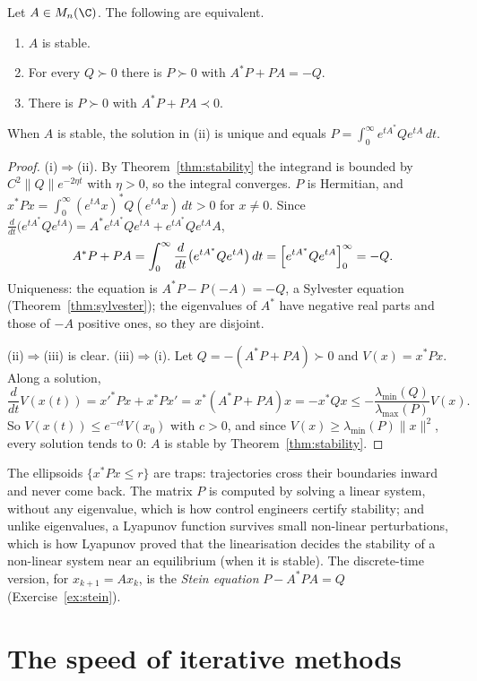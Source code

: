 \begin{theorem}[Lyapunov, 1892]\label{thm:lyapunov}
Let $A\in M_n(\C)$. The following are equivalent.
\begin{enumerate}[label=(\roman*)]
\item $A$ is stable.
\item For every $Q\succ0$ there is $P\succ0$ with $A^*P+PA=-Q$.
\item There is $P\succ0$ with $A^*P+PA\prec0$.
\end{enumerate}
When $A$ is stable, the solution in (ii) is unique and equals $P=\int_0^\infty e^{tA^*}Qe^{tA}\,dt$.
\end{theorem}
\begin{proof}
(i)$\Rightarrow$(ii). By Theorem~\ref{thm:stability} the integrand is bounded by $C^2\|Q\|e^{-2\eta t}$ with $\eta>0$, so the integral
converges. $P$ is Hermitian, and $x^*Px=\int_0^\infty(e^{tA}x)^*Q(e^{tA}x)\,dt>0$ for $x\ne0$. Since $\frac d{dt}\bigl(e^{tA^*}Qe^{tA}\bigr)=
A^*e^{tA^*}Qe^{tA}+e^{tA^*}Qe^{tA}A$,
\[
A^*P+PA=\int_0^\infty\frac d{dt}\bigl(e^{tA^*}Qe^{tA}\bigr)\,dt=\Bigl[e^{tA^*}Qe^{tA}\Bigr]_0^\infty=-Q.
\]
Uniqueness: the equation is $A^*P-P(-A)=-Q$, a Sylvester equation (Theorem~\ref{thm:sylvester}); the eigenvalues of $A^*$ have negative
real parts and those of $-A$ positive ones, so they are disjoint.

(ii)$\Rightarrow$(iii) is clear. (iii)$\Rightarrow$(i). Let $Q=-(A^*P+PA)\succ0$ and $V(x)=x^*Px$. Along a solution,
\[
\frac d{dt}V(x(t))=x'^*Px+x^*Px'=x^*(A^*P+PA)x=-x^*Qx\le-\frac{\lambda_{\min}(Q)}{\lambda_{\max}(P)}V(x).
\]
So $V(x(t))\le e^{-ct}V(x_0)$ with $c>0$, and since $V(x)\ge\lambda_{\min}(P)\|x\|^2$, every solution tends to $0$: $A$ is stable by
Theorem~\ref{thm:stability}.
\end{proof}

The ellipsoids $\{x^*Px\le r\}$ are traps: trajectories cross their boundaries inward and never come back. The matrix $P$ is computed
by solving a linear system, without any eigenvalue, which is how control engineers certify stability; and unlike eigenvalues, a
Lyapunov function survives small non-linear perturbations, which is how Lyapunov proved that the linearisation decides the stability
of a non-linear system near an equilibrium (when it is stable). The discrete-time version, for $x_{k+1}=Ax_k$, is the \emph{Stein
equation} $P-A^*PA=Q$ (Exercise~\ref{ex:stein}).

\section{The speed of iterative methods}

